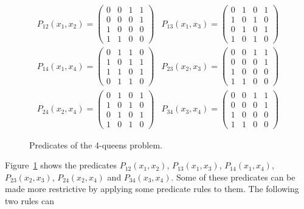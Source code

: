 \documentclass[a4paper,11pt]{article}
\begin{document}
\begin{figure}
\begin{eqnarray*}
P_{12}(x_1, x_2) = \left(
\begin{array}{cccc}
0 & 0 & 1 & 1 \\
0 & 0 & 0 & 1 \\
1 & 0 & 0 & 0 \\
1 & 1 & 0 & 0
\end{array} \right) &
P_{13}(x_1, x_3) = \left(
\begin{array}{cccc}
0 & 1 & 0 & 1 \\
1 & 0 & 1 & 0 \\
0 & 1 & 0 & 1 \\
1 & 0 & 1 & 0
\end{array} \right) \\
P_{14}(x_1, x_4) = \left(
\begin{array}{cccc}
0 & 1 & 1 & 0 \\
1 & 0 & 1 & 1 \\
1 & 1 & 0 & 1 \\
0 & 1 & 1 & 0
\end{array} \right) &
P_{23}(x_2, x_3) = \left(
\begin{array}{cccc}
0 & 0 & 1 & 1 \\
0 & 0 & 0 & 1 \\
1 & 0 & 0 & 0 \\
1 & 1 & 0 & 0
\end{array} \right) \\
P_{24}(x_2, x_4) = \left(
\begin{array}{cccc}
0 & 1 & 0 & 1 \\
1 & 0 & 1 & 0 \\
0 & 1 & 0 & 1 \\
1 & 0 & 1 & 0
\end{array} \right) &
P_{34}(x_3, x_4) = \left(
\begin{array}{cccc}
0 & 0 & 1 & 1 \\
0 & 0 & 0 & 1 \\
1 & 0 & 0 & 0 \\
1 & 1 & 0 & 0
\end{array} \right)
\end{eqnarray*}
\caption{Predicates of the 4-queens problem.}
\label{fig:predicates}
\end{figure}
Figure~\ref{fig:predicates} shows the predicates $P_{12}(x_1, x_2)$,
$P_{13}(x_1, x_3)$, $P_{14}(x_1, x_4)$, $P_{23}(x_2, x_3)$, 
$P_{24}(x_2, x_4)$ and
$P_{34}(x_3, x_4)$. 
Some of these predicates can be made more restrictive
by applying some predicate rules to them. The following two rules can
\end{document}
